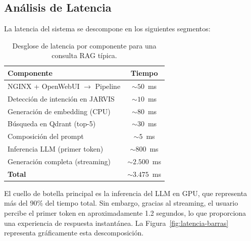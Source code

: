 \subsection{Análisis de Latencia}

La latencia del sistema se descompone en los siguientes segmentos:

\begin{table}[H]
\centering
\caption{Desglose de latencia por componente para una consulta RAG típica.}
\label{tab:latencia-desglose}
\begin{tabular}{lc}
\toprule
\textbf{Componente} & \textbf{Tiempo} \\
\midrule
NGINX + OpenWebUI $\rightarrow$ Pipeline  & $\sim 50$~ms \\
Detección de intención en JARVIS          & $\sim 10$~ms \\
Generación de embedding (CPU)             & $\sim 80$~ms \\
Búsqueda en Qdrant (top-5)               & $\sim 30$~ms \\
Composición del prompt                    & $\sim 5$~ms \\
Inferencia LLM (primer token)            & $\sim 800$~ms \\
Generación completa (streaming)           & $\sim 2.500$~ms \\
\midrule
\textbf{Total}                            & $\sim 3.475$~ms \\
\bottomrule
\end{tabular}
\end{table}

El cuello de botella principal es la inferencia del LLM en GPU, que representa más del 90\% del tiempo total. Sin embargo, gracias al streaming, el usuario percibe el primer token en aproximadamente 1.2 segundos, lo que proporciona una experiencia de respuesta instantánea. La Figura~\ref{fig:latencia-barras} representa gráficamente esta descomposición.

